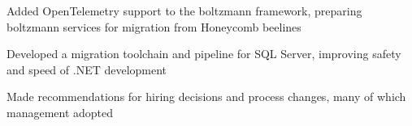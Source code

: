 \begin{job}

  \begin{extendedaccomplishments}
    \item Added OpenTelemetry support to the boltzmann framework, preparing boltzmann
      services for migration from Honeycomb beelines
    \item Developed a migration toolchain and pipeline for SQL Server,
      improving safety and speed of .NET development
    \item Made recommendations for hiring decisions and process changes, many
      of which management adopted
  \end{extendedaccomplishments}
\end{job}
